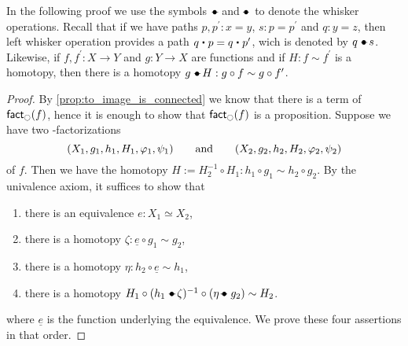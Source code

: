 In the following proof we use the symbols $\mathbin{-\!\!\!\!\bullet}$ and $\mathbin{\bullet\!\!\!\!-}$ to denote the whisker operations. Recall that if we have paths
$p,p^\prime:x= y$, $s:p= p^\prime$ and $q:y= z$, then left whisker operation provides a path $q\ct p=
q\ct p^\prime$, wich is denoted by $q\mathbin{-\!\!\!\!\bullet} s$. Likewise, if $f,f^\prime:X\to Y$ and $g:Y\to X$ are functions and if $H:f\sim
f^\prime$ is a homotopy, then there is a homotopy $g\mathbin{-\!\!\!\!\bullet} H:g\circ f\sim g\circ f^\prime$.

\begin{proof}
By \autoref{prop:to_image_is_connected} we know that there is a term of $\textsf{fact}_{\ocircle}(f)$, hence it is enough to
show that $\textsf{fact}_{\ocircle}(f)$ is a proposition. Suppose we have two \modal-factorizations
\begin{equation*}
{(X_1,g_1,h_1,H_1,\varphi_1,\psi_1)}\qquad\text{and}\qquad{(X_2,g_2,h_2,H_2,\varphi_2,\psi_2)}
\end{equation*}
of $f$. Then we have the homotopy $H:=H_2^{-1}\circ H_1:h_1\circ g_1\sim h_2\circ g_2$. By the univalence axiom, it suffices to show that
\begin{enumerate}
\item there is an equivalence $e:X_1\simeq X_2$,
\item there is a homotopy $\zeta:\underline{e}\circ g_1\sim g_2$,
\item there is a homotopy $\eta:h_2\circ\underline{e}\sim h_1$,
\item there is a homotopy $H_1 \circ(h_1\leftwhisker\zeta)^{-1}\circ(\eta\rightwhisker g_2)\sim H_2$.
\end{enumerate}
where $\underline{e}$ is the function underlying the equivalence. We prove these four assertions in that order.
\end{proof}
